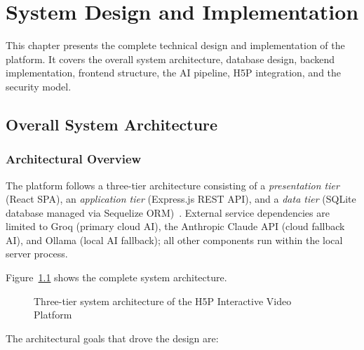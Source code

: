 \chapter{System Design and Implementation}

This chapter presents the complete technical design and implementation of the
platform. It covers the overall system architecture, database design, backend
implementation, frontend structure, the AI pipeline, H5P integration, and
the security model.

\section{Overall System Architecture}

\subsection{Architectural Overview}
\label{sec:architecture}

The platform follows a three-tier architecture consisting of a
\emph{presentation tier} (React SPA), an \emph{application tier}
(Express.js REST API), and a \emph{data tier} (SQLite database managed via
Sequelize ORM)~\cite{bass2012}. External service dependencies are limited to
Groq (primary cloud AI), the Anthropic Claude API (cloud fallback AI),
and Ollama (local AI fallback); all other components run within the
local server process.

Figure~\ref{fig:architecture} shows the complete system architecture.

\begin{figure}[H]
  \centering
  
  \caption{Three-tier system architecture of the H5P Interactive Video Platform}
  \label{fig:architecture}
\end{figure}

The architectural goals that drove the design are:

